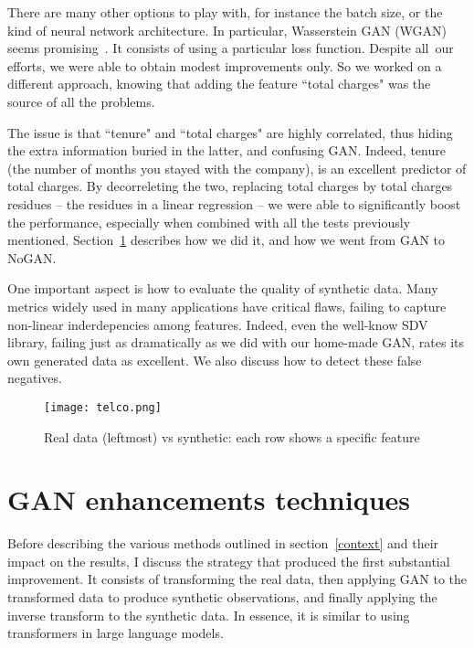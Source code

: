 \documentclass[oneside,10pt]{book}
\begin{document}
\noindent There are many other options to play with, for instance the
\textcolor{index}{batch size}, or the kind of neural network architecture. In particular,
 \textcolor{index}{Wasserstein GAN} (WGAN) seems promising~\cite{ieeewgan}. %
It consists of using a particular loss function.
 Despite all~our efforts, we were able to obtain modest improvements only. So we worked on a different approach, knowing that
 adding the feature ``total charges" was the source of all the problems.

The issue is that ``tenure" and ``total charges" are highly correlated, thus hiding the extra information buried in the latter, and confusing GAN.
 Indeed, tenure (the number of months you stayed with the company), is an excellent predictor of total charges. By decorreleting the two,
 replacing total charges by total charges residues -- the residues in a linear regression -- we were able to significantly boost the performance,
 especially when combined with all the tests previously mentioned. Section~\ref{potxs} describes how we did it, and how we went from GAN to NoGAN.

One important aspect is how to evaluate the quality of synthetic data. Many metrics widely used in many applications have critical flaws, failing to capture non-linear inderdepencies among features. Indeed, even the well-know SDV library, failing just as dramatically as we did with our home-made GAN, rates its
 own generated  data as excellent. We also discuss how to detect these false negatives.

\begin{figure}[H]
\centering
\texttt{[image: telco.png]} %
\caption{Real data (leftmost) vs synthetic:  each row shows a specific feature}
\label{fig:nogvvc}
\end{figure}

\section{GAN enhancements techniques}\label{potxs}

Before describing the various methods outlined in section~\ref{context} and their impact on the results, I discuss the strategy that produced
 the first substantial improvement. It consists of transforming the real data, then applying GAN to the transformed data to produce synthetic observations, and finally applying the inverse transform to the synthetic data. In essence, it is similar to using
\textcolor{index}{transformers}
 in large language models.
\end{document}
